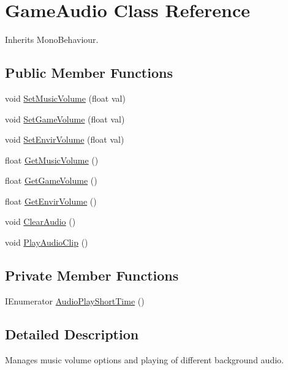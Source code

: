 \hypertarget{class_game_audio}{}\section{Game\+Audio Class Reference}
\label{class_game_audio}


Inherits Mono\+Behaviour.

\subsection*{Public Member Functions}
\begin{DoxyCompactItemize}
\item 
void \hyperlink{class_game_audio_a25c3d80bd38854c5e41a3dce1a9300a8}{Set\+Music\+Volume} (float val)
\item 
void \hyperlink{class_game_audio_a0939014f5a2245d81d78829ad8b9c159}{Set\+Game\+Volume} (float val)
\item 
void \hyperlink{class_game_audio_a14e235b89f31093cc9ea989317d5b6c7}{Set\+Envir\+Volume} (float val)
\item 
float \hyperlink{class_game_audio_ac21885c87c25cbf1a513b7173e4eca5a}{Get\+Music\+Volume} ()
\item 
float \hyperlink{class_game_audio_ad0ecbb6589554f4b800ad0210164f730}{Get\+Game\+Volume} ()
\item 
float \hyperlink{class_game_audio_a248a7e8b9bdecb3b3fc24e5654a40f8c}{Get\+Envir\+Volume} ()
\item 
void \hyperlink{class_game_audio_a4dcefb7ae958cf0acd5ab0901eb35532}{Clear\+Audio} ()
\item 
void \hyperlink{class_game_audio_a2237e039b778cc481e9c78a83d4fd7c8}{Play\+Audio\+Clip} ()
\end{DoxyCompactItemize}
\subsection*{Private Member Functions}
\begin{DoxyCompactItemize}
\item 
I\+Enumerator \hyperlink{class_game_audio_ad0c6d18af4a44a21b3068aa33296fa3e}{Audio\+Play\+Short\+Time} ()
\end{DoxyCompactItemize}


\subsection{Detailed Description}
Manages music volume options and playing of different background audio. 



